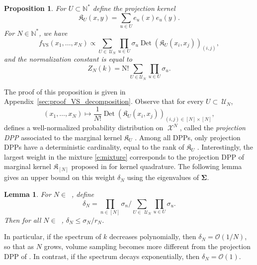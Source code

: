\documentclass[twoside,11pt]{book}
\newtheorem{proposition}{Proposition}
\newtheorem{lemma}{Lemma}
\DeclareMathOperator{\Det}{Det}
\DeclareMathOperator{\VS}{\mathrm{VS}}
\DeclareMathOperator{\X}{\mathcal{X}}
\DeclareMathOperator{\Ns}{\mathbb{N}^{*}}
\def\UN{\:\mathcal{U}_N}
\begin{document}
\begin{proposition} \label{prop:VS_decomposition}
For $U \subset \mathbb{N}^{*}$ define the projection kernel
\begin{equation}
\mathfrak{K}_{U}(x,y) = \sum\limits_{u \in U} e_{u}(x)e_{u}(y).
\end{equation}
For $N \in \mathbb{N}^{*}$, we have
\begin{equation}
  \label{e:mixture}
f_{\VS}(x_{1}, \dots, x_{N}) \propto \sum\limits_{ U \in \UN} \prod\limits_{u \in U} \sigma_{u} \Det (\mathfrak{K}_{U}(x_{i},x_{j}))_{(i,j)},
\end{equation}
and the normalization constant is equal to
\begin{equation}\label{eq:normalization_constant_VS}
Z_{N}(k) = \mathrm N! \sum\limits_{ U \in \mathcal{U}_{N}} \prod\limits_{u \in U} \sigma_{u}.
\end{equation}
\end{proposition}
The proof of this proposition is given in Appendix~\ref{sec:proof_VS_decomposition}. Observe that
for every $U \subset \UN$,
\begin{equation}
(x_{1}, \dots , x_{N}) \mapsto \frac{1}{N!} \Det (\mathfrak{K}_{U}(x_{i},x_{j}))_{(i,j) \in [N]\times [N] },
\end{equation}
defines a well-normalized probability distribution on $\X^{N}$, called the {\em projection DPP} associated to the marginal kernel $\mathfrak{K}_{U}$  \citep{HoKrPeVi06}. Among all DPPs, only projection DPPs have a deterministic cardinality, equal to the rank of $\mathfrak{K}_{U}$ \citep{HoKrPeVi06}. Interestingly, the largest weight in the mixture \eqref{e:mixture} corresponds to the projection DPP of marginal kernel $\mathfrak{K}_{[N]}$ proposed in \citep{BeBaCh19} for kernel quadrature. The following lemma gives an upper bound on this weight $\delta_N$ using the eigenvalues of $\bm{\Sigma}$.
\begin{lemma}\label{lemma:projection_DPP_weight}
For $N \in \Ns$, define
\begin{equation}
\delta_{N} = \prod\limits_{n \in [N]} \sigma_{n} \bigg/\sum\limits_{ U \in \: \UN} \prod\limits_{u \in U} \sigma_{u}.
\end{equation}
Then for all $N \in \Ns$, $\displaystyle \delta_{N} \leq \sigma_{N} / r_{N}$.
\end{lemma}
In particular, if the spectrum of $k$ decreases polynomially, then $\delta_{N} = \mathcal{O}(1/N)$, so that as $N$ grows, volume sampling becomes more different from the projection DPP of \cite{BeBaCh19}. In contrast, if the spectrum decays exponentially, then $\delta_{N} = \mathcal{O}(1)$.
\end{document}
